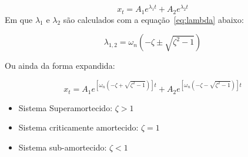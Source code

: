 \documentclass[a4paper,12pt]{article}
\begin{document}
\begin{equation}\label{eq:xt}
    x_{t}=A_{1} e^{\lambda_{1} t}+A_{2} e^{\lambda_{2} t}
\end{equation}
Em que $\lambda_1$ e $\lambda_2$ são calculados com a equação~\ref{eq:lambda}
abaixo:

\begin{equation}\label{eq:lambda}
\lambda_{1,2}=\omega_{n}\left(-\zeta\pm \sqrt{\zeta^{2}-1}\right)
\end{equation}

Ou ainda da forma expandida:

\begin{equation}\label{eq:xt_expandida}
x_{t}=A_{1} e^{\left[\omega_{n}(-\zeta+\sqrt{\zeta^{2}-1})\right] t}+A_{2} e^{\left[\omega_{n}(-\zeta-\sqrt{\zeta^{2}-1})\right] t}
\end{equation}

\begin{itemize}
    \item Sistema Superamortecido: $\zeta > 1$
    \item Sistema criticamente amortecido: $\zeta = 1$
    \item Sistema sub-amortecido: $\zeta < 1$
\end{itemize}
\end{document}
